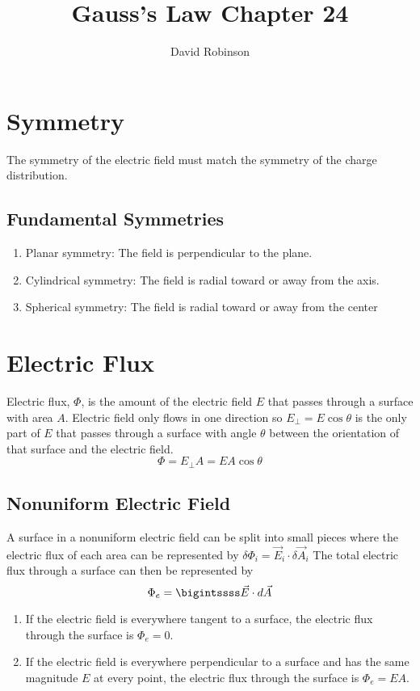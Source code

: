 \documentclass{article}
\title{Gauss's Law Chapter 24}
\author{David Robinson}
\date{}
\begin{document}
\maketitle

\section*{Symmetry}
The symmetry of the electric field must match the symmetry of the charge distribution.

\subsection*{Fundamental Symmetries}
\begin{enumerate}
    \item Planar symmetry: The field is perpendicular to the plane.
    \item Cylindrical symmetry: The field is radial toward or away from the axis.
    \item Spherical symmetry: The field is radial toward or away from the center
\end{enumerate}

\section*{Electric Flux}
Electric flux, $\Phi$, is the amount of the electric field $E$ that passes through a surface with area $A$.
Electric field only flows in one direction so $E_\perp=E\cos\theta$ is the only part of $E$ that passes through a surface with angle $\theta$ between the orientation of that surface and the electric field.
\[\Phi = E_\perp A = EA\cos\theta\]

\subsection*{Nonuniform Electric Field}
A surface in a nonuniform electric field can be split into small pieces where the electric flux of each area can be represented by $\delta\Phi_i = \vec{E}_i\cdot\delta\vec{A}_i$
The total electric flux through a surface can then be represented by
\[\Phi_e =\bigintssss \vec{E}\cdot d\vec{A}\]

\begin{enumerate}
    \item If the electric field is everywhere tangent to a surface, the electric flux through the surface is $\Phi_e = 0$.
    \item If the electric field is everywhere perpendicular to a surface and has the same magnitude $E$ at every point, the electric flux through the surface is $\Phi_e = EA$.
\end{enumerate}
\end{document}
